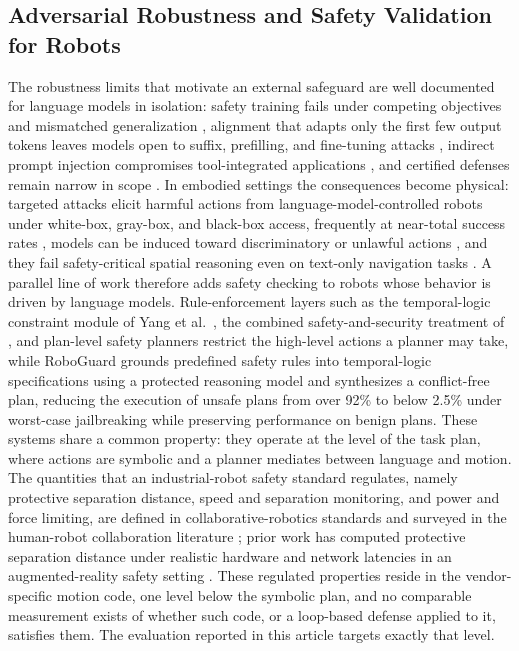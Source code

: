 \documentclass{ieeeaccess}
\begin{document}
\subsection{Adversarial Robustness and Safety Validation for Robots}
The robustness limits that motivate an external safeguard are well documented for
language models in isolation: safety training fails under competing objectives and
mismatched generalization \cite{ref28}, alignment that adapts only the first few
output tokens leaves models open to suffix, prefilling, and fine-tuning attacks
\cite{ref29}, indirect prompt injection compromises tool-integrated applications
\cite{ref30}, and certified defenses remain narrow in scope \cite{ref31}. In
embodied settings the consequences become physical: targeted attacks elicit harmful
actions from language-model-controlled robots under white-box, gray-box, and
black-box access, frequently at near-total success rates \cite{ref32}, models can be
induced toward discriminatory or unlawful actions \cite{ref33}, and they fail
safety-critical spatial reasoning even on text-only navigation tasks \cite{ref34}.
A parallel line of work therefore adds safety checking to robots whose behavior is
driven by language models. Rule-enforcement layers such as the temporal-logic
constraint module of Yang et al.\ \cite{ref8}, the combined safety-and-security
treatment of \cite{ref9}, and plan-level safety planners \cite{ref35, ref36}
restrict the high-level actions a planner may take, while RoboGuard \cite{ref10}
grounds predefined safety rules into temporal-logic specifications using a protected
reasoning model and synthesizes a conflict-free plan, reducing the execution of
unsafe plans from over 92\% to below 2.5\% under worst-case jailbreaking
while preserving performance on benign plans. These systems share a common property:
they operate at the level of the task plan, where actions are symbolic and a planner
mediates between language and motion. The quantities that an industrial-robot safety
standard regulates, namely protective separation distance, speed and separation
monitoring, and power and force limiting, are defined in collaborative-robotics
standards \cite{ref37, ref38, ref39} and surveyed in the human-robot collaboration
literature \cite{ref40, ref41, ref42, ref43, ref44}; prior work has computed
protective separation distance under realistic hardware and network latencies in an
augmented-reality safety setting \cite{ref45, ref46}. These regulated properties
reside in the vendor-specific motion code, one level below the symbolic plan, and no
comparable measurement exists of whether such code, or a loop-based defense applied
to it, satisfies them. The evaluation reported in this article targets exactly that
level.
\end{document}
